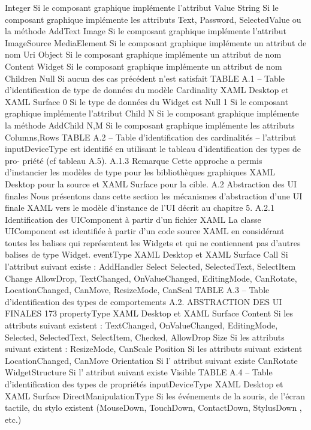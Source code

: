 \documentclass{article}
\begin{document}
Integer
Si le composant graphique implémente l’attribut Value
String
Si le composant graphique implémente les attributs Text, Password, SelectedValue
ou la méthode AddText
Image
Si le composant graphique implémente l’attribut ImageSource
MediaElement
Si le composant graphique implémente un attribut de nom Uri
Object
Si le composant graphique implémente un attribut de nom Content
Widget
Si le composant graphique implémente un attribut de nom Children
Null
Si aucun des cas précédent n’est satisfait
TABLE A.1 – Table d’identiﬁcation de type de données du modèle
Cardinality
XAML Desktop et XAML Surface
0
Si le type de données du Widget est Null
1
Si le composant graphique implémente l’attribut Child
N
Si le composant graphique implémente la méthode AddChild
N,M
Si le composant graphique implémente les attributs Columns,Rows
TABLE A.2 – Table d’identiﬁcation des cardinalités
– l’attribut inputDeviceType est identiﬁé en utilisant le tableau d’identiﬁcation des types de pro-
priété (cf tableau A.5).
A.1.3
Remarque
Cette approche a permis d’instancier les modèles de type pour les bibliothèques graphiques
XAML Desktop pour la source et XAML Surface pour la cible.
A.2
Abstraction des UI ﬁnales
Nous présentons dans cette section les mécanismes d’abstraction d’une UI ﬁnale XAML vers le
modèle d’instance de l’UI décrit au chapitre 5.
A.2.1
Identiﬁcation des UIComponent à partir d’un ﬁchier XAML
La classe UIComponent est identiﬁée à partir d’un code source XAML en considérant toutes les
balises qui représentent les Widgets et qui ne contiennent pas d’autres balises de type Widget.
eventType
XAML Desktop et XAML Surface
Call
Si l’attribut suivant existe : AddHandler
Select
Selected, SelectedText, SelectItem
Change
AllowDrop, TextChanged, OnValueChanged, EditingMode, CanRotate,
LocationChanged, CanMove, ResizeMode, CanScal
TABLE A.3 – Table d’identiﬁcation des types de comportements
A.2. ABSTRACTION DES UI FINALES
173
propertyType
XAML Desktop et XAML Surface
Content
Si les attributs suivant existent : TextChanged, OnValueChanged,
EditingMode, Selected, SelectedText, SelectItem, Checked, AllowDrop
Size
Si les attributs suivant existent : ResizeMode, CanScale
Position
Si les attributs suivant existent LocationChanged, CanMove
Orientation
Si l’ attribut suivant existe CanRotate
WidgetStructure
Si l’ attribut suivant existe Visible
TABLE A.4 – Table d’identiﬁcation des types de propriétés
inputDeviceType
XAML Desktop et XAML Surface
DirectManipulationType
Si les événements de la souris, de l’écran tactile, du stylo
existent (MouseDown, TouchDown, ContactDown, StylusDown
, etc.)
\end{document}
